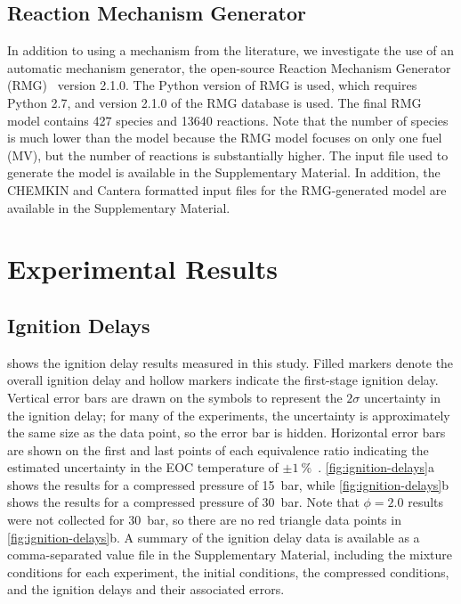 \documentclass[letterpaper, review, sort&compress]{elsarticle}
\begin{document}
\subsection{Reaction Mechanism Generator}\label{sec:reaction-mechanism-generator}

In addition to using a mechanism from the literature, we investigate the use of an automatic
mechanism generator, the open-source Reaction Mechanism Generator (RMG)~\cite{Allen2012} version
2.1.0. The Python version of RMG is used, which requires Python 2.7, and version 2.1.0 of the RMG
database is used. The final RMG model contains 427 species and 13640 reactions. Note that the number
of species is much lower than the \citet{Dievart2013} model because the RMG model focuses on only
one fuel (MV), but the number of reactions is substantially higher. The input file used to generate
the model is available in the Supplementary Material. In addition, the CHEMKIN and Cantera formatted
input files for the RMG-generated model are available in the Supplementary Material.

\section{Experimental Results}\label{sec:experimental-results}
\subsection{Ignition Delays}\label{sec:ignition-delays}

 shows the ignition delay results measured in this study. Filled markers
denote the overall ignition delay and hollow markers indicate the first-stage ignition delay.
Vertical error bars are drawn on the symbols to represent the \(2\sigma\) uncertainty in the
ignition delay; for many of the experiments, the uncertainty is approximately the same size as the
data point, so the error bar is hidden. Horizontal error bars are shown on the first and last points
of each equivalence ratio indicating the estimated uncertainty in the EOC temperature of
$\pm\SI{1}{\percent}$~\cite{Weber2015}. \cref{fig:ignition-delays}a shows the results for a
compressed pressure of \SI{15}{\bar}, while \cref{fig:ignition-delays}b shows the results for a
compressed pressure of \SI{30}{\bar}. Note that $\phi=2.0$ results were not collected for
\SI{30}{\bar}, so there are no red triangle data points in \cref{fig:ignition-delays}b. A summary of
the ignition delay data is available as a comma-separated value file in the Supplementary Material,
including the mixture conditions for each experiment, the initial conditions, the compressed
conditions, and the ignition delays and their associated errors.
\end{document}
